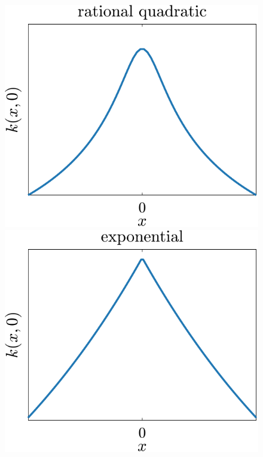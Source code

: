 \begin{figure}[t]
	\includegraphics[scale=0.4]{../images/chap2_kernel_rq.pdf} \\[3pt]
    \includegraphics[scale=0.4]{../images/chap2_kernel_ex.pdf} \hspace{3pt}

\end{figure}
